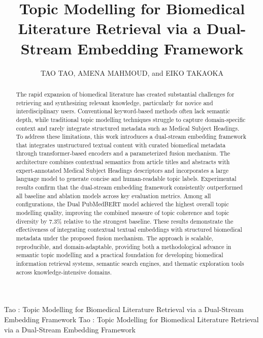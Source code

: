 \documentclass{ieeeaccess}
\begin{document}

\title{Topic Modelling for Biomedical Literature Retrieval via a Dual-Stream Embedding Framework}
\author{\uppercase{Tao Tao},
\uppercase{Amena Mahmoud}, and
\uppercase{Eiko Takaoka}}

\address[1]{Graduate School of Science and Technology, Sophia University, Tokyo 102-8554, Japan (e-mail: c2578666@eagle.sophia.ac.jp; m-g-eiko@sophia.ac.jp)}
\address[2]{Department of Computer Science, Faculty of Computers and Information, Kafrelsheikh University, Kafrelsheikh 33516, Egypt}

\markboth
{Tao \headeretal: Topic Modelling for Biomedical Literature Retrieval via a Dual-Stream Embedding Framework}
{Tao \headeretal: Topic Modelling for Biomedical Literature Retrieval via a Dual-Stream Embedding Framework}



\begin{abstract}
The rapid expansion of biomedical literature has created substantial challenges for retrieving and synthesizing relevant knowledge, particularly for novice and interdisciplinary users. Conventional keyword-based methods often lack semantic depth, while traditional topic modelling techniques struggle to capture domain-specific context and rarely integrate structured metadata such as Medical Subject Headings. To address these limitations, this work introduces a dual-stream embedding framework that integrates unstructured textual content with curated biomedical metadata through transformer-based encoders and a parameterized fusion mechanism. The architecture combines contextual semantics from article titles and abstracts with expert-annotated Medical Subject Headings descriptors and incorporates a large language model to generate concise and human-readable topic labels. Experimental results confirm that the dual-stream embedding framework consistently outperformed all baseline and ablation models across key evaluation metrics. Among all configurations, the Dual PubMedBERT model achieved the highest overall topic modelling quality, improving the combined measure of topic coherence and topic diversity by 7.3\% relative to the strongest baseline. These results demonstrate the effectiveness of integrating contextual textual embeddings with structured biomedical metadata under the proposed fusion mechanism. The approach is scalable, reproducible, and domain-adaptable, providing both a methodological advance in semantic topic modelling and a practical foundation for developing biomedical information retrieval systems, semantic search engines, and thematic exploration tools across knowledge-intensive domains.
\end{abstract}
\end{document}
